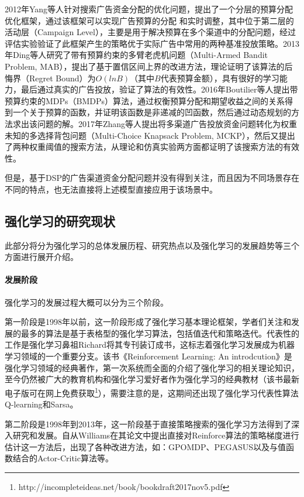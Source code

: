 2012年Yang等人\citep{yang2012budget}针对搜索广告资金分配的优化问题，提出了一个分层的预算分配优化框架，通过该框架可以实现广告预算的分配
和实时调整，其中位于第二层的活动层（Campaign Level），主要是用于解决预算在多个渠道中的分配问题，经过评估实验验证了此框架产生的策略优于实际广告中常用的两种基准投放策略。2013年Ding等人\citep{ding2013multi}研究了带有预算约束的多臂老虎机问题（Multi-Armed Bandit Problem, MAB），提出了基于置信区间上界的改进方法，理论证明了该算法的后悔界（Regret Bound）为$O(lnB)$（其中$B$代表预算金额），具有很好的学习能力，最后通过真实的广告投放，验证了算法的有效性。2016年Boutilier等人\citep{boutilier2016budget}提出带预算约束的MDPs（BMDPs）算法，通过权衡预算分配和期望收益之间的关系得到一个关于预算的函数，并证明该函数是非递减的凹函数，然后通过动态规划的方法求出该问题的解。2017年Zhang等人\citep{zhang2017multi}提出将多渠道广告投放资金问题转化为权重未知的多选择背包问题（Multi-Choice Knapsack Problem, MCKP），然后又提出了两种权重阈值的搜索方法，从理论和仿真实验两方面都证明了该搜索方法的有效性。

但是，基于DSP的广告渠道资金分配问题并没有得到关注，而且因为不同场景存在不同的特点，也无法直接将上述模型直接应用于该场景中。

\subsection{强化学习的研究现状}
此部分将分为强化学习的总体发展历程、研究热点以及强化学习的发展趋势等三个方面进行展开介绍。

\paragraph{发展阶段}
强化学习的发展过程大概可以分为三个阶段。

第一阶段是1998年以前，这一阶段形成了强化学习基本理论框架，学者们关注和发展的最多的算法是基于表格型的强化学习算法，包括值迭代和策略迭代。代表性的工作是强化学习鼻祖Richard将其专刊装订成书，这标志着强化学习发展成为机器学习领域的一个重要分支。该书《Reinforcement Learning: An introdcution》是强化学习领域的经典著作，第一次系统而全面的介绍了强化学习的相关理论知识，至今仍然被广大的教育机构和强化学习爱好者作为强化学习的经典教材（该书最新电子版可在网上免费获取\footnote{http://incompleteideas.net/book/bookdraft2017nov5.pdf}），需要注意的是，这期间还出现了强化学习代表性算法Q-learning\citep{watkins1992q}和Sarsa\citep{rummery1994line}。

第二阶段是1998年到2013年，这一阶段基于直接策略搜索的强化学习方法得到了深入研究和发展。自从Williams在其论文\citep{williams1992simple}中提出直接对Reinforce算法的策略梯度进行估计这一方法后，出现了各种改进方法，如：GPOMDP\citep{baxter2001infinite}、PEGASUS\citep{neumann2005reinforcement}以及与值函数结合的Actor-Critic算法\citep{konda2000actor}等。

